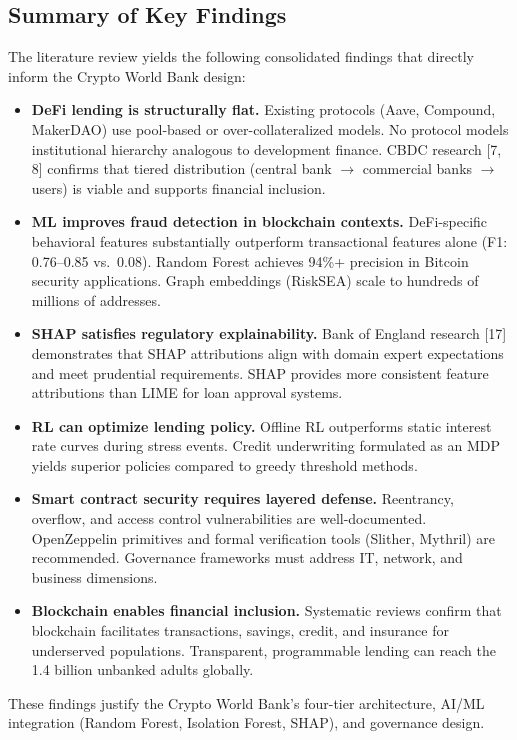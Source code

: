\documentclass[11pt,a4paper]{article}
\begin{document}
\begin{doublespacing}
\subsection{Summary of Key Findings}

The literature review yields the following consolidated findings that directly inform the Crypto World Bank design:

\begin{itemize}[noitemsep]
\item \textbf{DeFi lending is structurally flat.} Existing protocols (Aave, Compound, MakerDAO) use pool-based or over-collateralized models. No protocol models institutional hierarchy analogous to development finance. CBDC research [7, 8] confirms that tiered distribution (central bank $\to$ commercial banks $\to$ users) is viable and supports financial inclusion.
\item \textbf{ML improves fraud detection in blockchain contexts.} DeFi-specific behavioral features substantially outperform transactional features alone (F1: 0.76--0.85 vs.\ 0.08). Random Forest achieves 94\%+ precision in Bitcoin security applications. Graph embeddings (RiskSEA) scale to hundreds of millions of addresses.
\item \textbf{SHAP satisfies regulatory explainability.} Bank of England research [17] demonstrates that SHAP attributions align with domain expert expectations and meet prudential requirements. SHAP provides more consistent feature attributions than LIME for loan approval systems.
\item \textbf{RL can optimize lending policy.} Offline RL outperforms static interest rate curves during stress events. Credit underwriting formulated as an MDP yields superior policies compared to greedy threshold methods.
\item \textbf{Smart contract security requires layered defense.} Reentrancy, overflow, and access control vulnerabilities are well-documented. OpenZeppelin primitives and formal verification tools (Slither, Mythril) are recommended. Governance frameworks must address IT, network, and business dimensions.
\item \textbf{Blockchain enables financial inclusion.} Systematic reviews confirm that blockchain facilitates transactions, savings, credit, and insurance for underserved populations. Transparent, programmable lending can reach the 1.4 billion unbanked adults globally.
\end{itemize}

These findings justify the Crypto World Bank's four-tier architecture, AI/ML integration (Random Forest, Isolation Forest, SHAP), and governance design.

\end{doublespacing}
\end{document}
